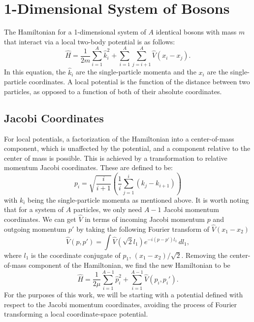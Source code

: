 \section{1-Dimensional System of Bosons}

The Hamiltonian for a 1-dimensional system of $A$ identical bosons with mass $m$ that interact via a local two-body potential is as follows:
\begin{equation}
\hat{H} = \frac{1}{2 m} \sum_{i=1}^A \hat{k}_i^2 + \sum_{i=1}^A\sum_{j=i+1}^{A} \hat{V}(x_i - x_j).
\end{equation}
In this equation, the $\hat{k}_i$ are the single-particle momenta and the $x_i$ are the single-particle coordinates. A local potential is the function of the distance between two particles, as opposed to a function of both of their absolute coordinates.

\subsection{Jacobi Coordinates}

For local potentials, a factorization of the Hamiltonian into a center-of-mass component, which is unaffected by the potential, and a component relative to the center of mass is possible. This is achieved by a transformation to relative momentum Jacobi coordinates. These are defined to be:
\begin{equation}
p_i = \sqrt{\frac{i}{i+1}} \left(\frac{1}{i} \sum_{j=1}^{i}(k_j - k_{i+1})\right)
\end{equation}
with $k_i$ being the single-particle momenta as mentioned above. It is worth noting that for a system of $A$ particles, we only need $A-1$ Jacobi momentum coordinates. We can get $\hat{V}$ in terms of incoming Jacobi momentum $p$ and outgoing momentum $p'$ by taking the following Fourier transform of $\hat{V}(x_1 - x_2)$
\begin{equation}
\hat{V}(p, p') = \int \hat{V}(\sqrt{2} l_1) e^{- i (p - p') l_1} \,dl_1,
\end{equation}
where $l_1$ is the coordinate conjugate of $p_1$, $(x_1 - x_2)/\sqrt{2}$. Removing the center-of-mass component of the Hamiltonian, we find the new Hamiltonian to be
\begin{equation}
\hat{H} = \frac{1}{2 \mu} \sum_{i=1}^{A-1} \hat{p}_i^2 + \sum_{i=1}^{A-1}\hat{V}(p_i, p_i').
\end{equation}
For the purposes of this work, we will be starting with a potential defined with respect to the Jacobi momentum coordinates, avoiding the process of Fourier transforming a local coordinate-space potential.

